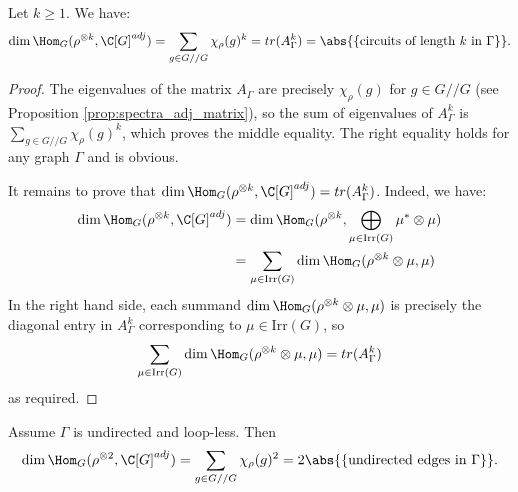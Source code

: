 \begin{lemma}\label{lem:trace}
 Let $k\geq 1$. We have: 
 $$
\dim \Hom_G(\rho^{\otimes k}, \C[G]^{adj}) = \sum_{g \in G//G} \chi_\rho(g)^k = tr(A^k_{\Gamma}) = \abs{\{\text{circuits of length } k \text{ in } \Gamma \}}.  $$

\end{lemma}
\begin{proof}
 The eigenvalues of the matrix $A_{\Gamma}$ are precisely $\chi_\rho(g)$ for $g \in G//G$ (see Proposition \ref{prop:spectra_adj_matrix}), so the sum of eigenvalues of $A^k_{\Gamma}$ is $\sum_{g \in G//G} \chi_\rho(g)^k $, which proves the middle equality. The right equality holds for any graph $\Gamma$ and is obvious.
 
 It remains to prove that $\dim \Hom_G(\rho^{\otimes k}, \C[G]^{adj}) = tr(A^k_{\Gamma})$. Indeed, we have:
 \begin{align*}
 \dim \Hom_G(\rho^{\otimes k}, \C[G]^{adj}) &= \dim \Hom_G(\rho^{\otimes k}, \bigoplus_{\mu \in \mathrm{Irr}(G)} \mu^* \otimes \mu) \\
 &= \sum_{\mu \in \mathrm{Irr}(G)} \dim \Hom_G(\rho^{\otimes k}\otimes \mu, \mu)
 \end{align*}
 In the right hand side, each summand $\dim \Hom_G(\rho^{\otimes k}\otimes \mu, \mu)$ is precisely the diagonal entry in $A^k_{\Gamma}$ corresponding to $\mu \in \mathrm{Irr}(G)$, so $$\sum_{\mu \in \mathrm{Irr}(G)} \dim \Hom_G(\rho^{\otimes k}\otimes \mu, \mu)= tr(A^k_{\Gamma})$$ as required.
\end{proof}

\begin{coro}\label{cor:trace}
 Assume $\Gamma$ is undirected and loop-less. Then $$\dim \Hom_G(\rho^{\otimes 2}, \C[G]^{adj}) =\sum_{g \in G//G} \chi_\rho(g)^2 = 2\abs{\{\text{undirected edges in } \Gamma\}}.$$
\end{coro}





